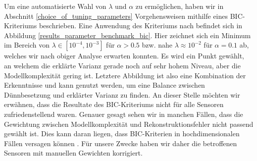 Um eine automatisierte Wahl von $\lambda$ und $\alpha$ zu ermöglichen, haben wir in Abschnitt \ref{choice_of_tuning_parameters} Vorgehensweisen mithilfe eines BIC-Kriteriums beschrieben. Eine Anwendung des Kriteriums nach \cite{croux, guo} befindet sich in Abbildung \ref{results_parameter_benchmark_bic}. Hier zeichnet sich ein Minimum im Bereich von $\lambda \in [10^{-4}, 10^{-3}]$ für $\alpha > 0.5$ bzw. nahe $\lambda \approx 10^{-2}$ für $\alpha = 0.1$ ab, welches wir nach obiger Analyse erwarten konnten. Es wird ein Punkt gewählt, an welchem die erklärte Varianz gerade noch auf sehr hohem Niveau, aber die Modellkomplexität gering ist. Letztere Abbildung ist also eine Kombination der Erkenntnisse und kann genutzt werden, um eine Balance zwischen Dünnbesetzung und erklärter Varianz zu finden. An dieser Stelle möchten wir erwähnen, dass die Resultate des BIC-Kriteriums nicht für alle Sensoren zufriedenstellend waren. Genauer gesagt sehen wir in manchen Fällen, dass die Gewichtung zwischen Modellkomplexität und Rekonstruktionsfehler nicht passend gewählt ist. Dies kann daran liegen, dass BIC-Kriterien in hochdimensionalen Fällen versagen können \cite{giraud}. Für unsere Zwecke haben wir daher die betroffenen Sensoren mit manuellen Gewichten korrigiert.

